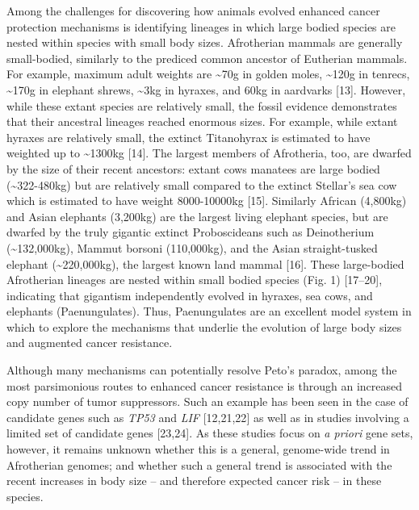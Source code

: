 \documentclass[]{elsarticle} %
\begin{document}
Among the challenges for discovering how animals evolved enhanced cancer
protection mechanisms is identifying lineages in which large bodied
species are nested within species with small body sizes. Afrotherian
mammals are generally small-bodied, similarly to the prediced common
ancestor of Eutherian mammals. For example, maximum adult weights are
\textasciitilde{}70g in golden moles, \textasciitilde{}120g in tenrecs,
\textasciitilde{}170g in elephant shrews, \textasciitilde{}3kg in
hyraxes, and 60kg in aardvarks {[}13{]}. However, while these extant
species are relatively small, the fossil evidence demonstrates that
their ancestral lineages reached enormous sizes. For example, while
extant hyraxes are relatively small, the extinct Titanohyrax is
estimated to have weighted up to \textasciitilde{}1300kg {[}14{]}. The
largest members of Afrotheria, too, are dwarfed by the size of their
recent ancestors: extant cows manatees are large bodied
(\textasciitilde{}322-480kg) but are relatively small compared to the
extinct Stellar's sea cow which is estimated to have weight 8000-10000kg
{[}15{]}. Similarly African (4,800kg) and Asian elephants (3,200kg) are
the largest living elephant species, but are dwarfed by the truly
gigantic extinct Proboscideans such as Deinotherium
(\textasciitilde{}132,000kg), Mammut borsoni (110,000kg), and the Asian
straight-tusked elephant (\textasciitilde{}220,000kg), the largest known
land mammal {[}16{]}. These large-bodied Afrotherian lineages are nested
within small bodied species (Fig. 1) {[}17--20{]}, indicating that
gigantism independently evolved in hyraxes, sea cows, and elephants
(Paenungulates). Thus, Paenungulates are an excellent model system in
which to explore the mechanisms that underlie the evolution of large
body sizes and augmented cancer resistance.

Although many mechanisms can potentially resolve Peto's paradox, among
the most parsimonious routes to enhanced cancer resistance is through an
increased copy number of tumor suppressors. Such an example has been
seen in the case of candidate genes such as \emph{TP53} and \emph{LIF}
{[}12,21,22{]} as well as in studies involving a limited set of
candidate genes {[}23,24{]}. As these studies focus on \emph{a priori}
gene sets, however, it remains unknown whether this is a general,
genome-wide trend in Afrotherian genomes; and whether such a general
trend is associated with the recent increases in body size -- and
therefore expected cancer risk -- in these species.
\end{document}
